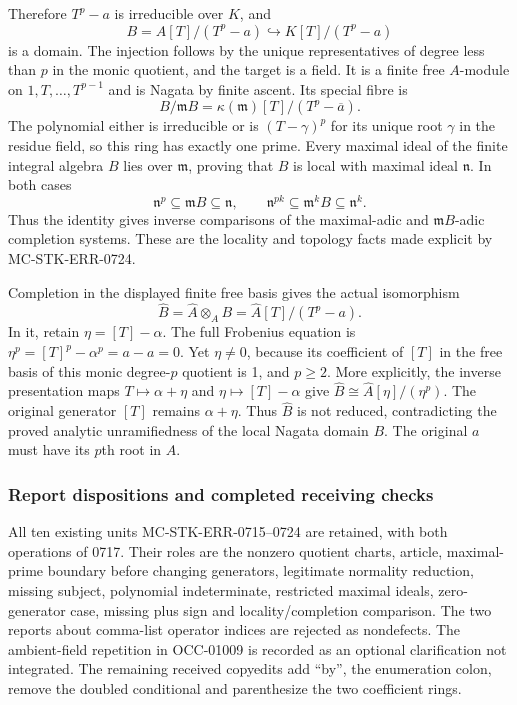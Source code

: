 Therefore \(T^p-a\) is irreducible over \(K\), and \[
 B=A[T]/(T^p-a)\hookrightarrow K[T]/(T^p-a)
\] is a domain. The injection follows by the unique representatives of degree less than \(p\) in the monic quotient, and the target is a field. It is a finite free \(A\)-module on \(1,T,\ldots,T^{p-1}\) and is Nagata by finite ascent. Its special fibre is \[
 B/\mathfrak mB=\kappa(\mathfrak m)[T]/(T^p-\overline a).
\] The polynomial either is irreducible or is \((T-\gamma)^p\) for its unique root \(\gamma\) in the residue field, so this ring has exactly one prime. Every maximal ideal of the finite integral algebra \(B\) lies over \(\mathfrak m\), proving that \(B\) is local with maximal ideal \(\mathfrak n\). In both cases \[
 \mathfrak n^p\subseteq\mathfrak mB\subseteq\mathfrak n,
 \qquad\mathfrak n^{pk}\subseteq\mathfrak m^kB\subseteq\mathfrak n^k.
\] Thus the identity gives inverse comparisons of the maximal-adic and \(\mathfrak mB\)-adic completion systems. These are the locality and topology facts made explicit by MC-\AlgebraIdentifierBreak{}STK-\AlgebraIdentifierBreak{}ERR-\AlgebraIdentifierBreak{}0724.

Completion in the displayed finite free basis gives the actual isomorphism \[
 \widehat B=\widehat A\otimes_A B
 =\widehat A[T]/(T^p-a).
\] In it, retain \(\eta=[T]-\alpha\). The full Frobenius equation is \(\eta^p=[T]^p-\alpha^p=a-a=0\). Yet \(\eta\ne0\), because its coefficient of \([T]\) in the free basis of this monic degree-\(p\) quotient is 1, and \(p\geq2\). More explicitly, the inverse presentation maps \(T\mapsto\alpha+\eta\) and \(\eta\mapsto[T]-\alpha\) give \(\widehat B\cong\widehat A[\eta]/(\eta^p)\). The original generator \([T]\) remains \(\alpha+\eta\). Thus \(\widehat B\) is not reduced, contradicting the proved analytic unramifiedness of the local Nagata domain \(B\). The original \(a\) must have its \(p\)th root in \(A\).

\subsubsection{Report dispositions and completed receiving checks}\label{algebra-proof-067-report-dispositions-and-completed-receiving-checks}

All ten existing units MC-\AlgebraIdentifierBreak{}STK-\AlgebraIdentifierBreak{}ERR-\AlgebraIdentifierBreak{}0715--\AlgebraIdentifierBreak{}0724 are retained, with both operations of 0717. Their roles are the nonzero quotient charts, article, maximal-prime boundary before changing generators, legitimate normality reduction, missing subject, polynomial indeterminate, restricted maximal ideals, zero-generator case, missing plus sign and locality/completion comparison. The two reports about comma-list operator indices are rejected as nondefects. The ambient-field repetition in OCC-01009 is recorded as an optional clarification not integrated. The remaining received copyedits add ``by'', the enumeration colon, remove the doubled conditional and parenthesize the two coefficient rings.

